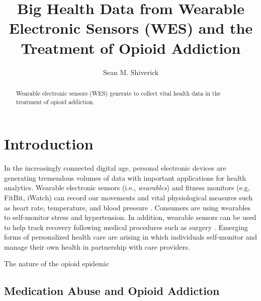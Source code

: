 \documentclass[sigconf]{acmart}
\begin{document}
\title{Big Health Data from Wearable Electronic Sensors (WES) and 
the Treatment of Opioid Addiction}

\author{Sean M. Shiverick}


\begin{abstract}
Wearable electronic sensors (WES) generate to collect
vital health data in the treatment of opioid addiction. 
\end{abstract}


\maketitle


\section{Introduction}

In the increasingly connected digital age, personal electronic devices are 
generating tremendous volumes of data with important applications for 
health analytics. Wearable electronic sensors (i.e., \emph{wearables}) and
fitness monitors (e.g, FitBit, iWatch) can record our movements and vital 
physiological measures such as heart rate, temperature, and blood pressure 
\cite{metcalf16}. Consumers are using wearables to self-monitor stress 
and hypertension. In addition, wearable sensors can be used to help track
recovery following medical procedures such as surgery \cite{atallah11}. 
Emerging forms of personalized health care are arising in which individuals 
self-monitor and manage their own health in partnership with care providers.


The nature of the opioid epidemic


\cite{cdc17}



\cite{nida17}



\subsection{Medication Abuse and Opioid Addiction} \cite{boyer10}
\end{document}
